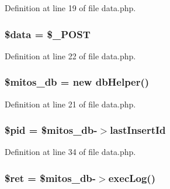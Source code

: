 \-Definition at line 19 of file data.\-php.

\hypertarget{patientfile_2new_2data_8php_a6efc15b5a2314dd4b5aaa556a375c6d6}{
\subsubsection[{\$data}]{\setlength{\rightskip}{0pt plus 5cm}\$data = \$\-\_\-\-P\-O\-S\-T}}\label{patientfile_2new_2data_8php_a6efc15b5a2314dd4b5aaa556a375c6d6}


\-Definition at line 22 of file data.\-php.

\hypertarget{patientfile_2new_2data_8php_ab5d961f93efe4e2e8d8374f01dd6c65a}{
\subsubsection[{\$mitos\-\_\-db}]{\setlength{\rightskip}{0pt plus 5cm}\$mitos\-\_\-db = new {\bf db\-Helper}()}}\label{patientfile_2new_2data_8php_ab5d961f93efe4e2e8d8374f01dd6c65a}


\-Definition at line 21 of file data.\-php.

\hypertarget{patientfile_2new_2data_8php_a9b726f748a2135350f7d86668cc058ee}{
\subsubsection[{\$pid}]{\setlength{\rightskip}{0pt plus 5cm}\$pid = \$mitos\-\_\-db-\/$>$last\-Insert\-Id}}\label{patientfile_2new_2data_8php_a9b726f748a2135350f7d86668cc058ee}


\-Definition at line 34 of file data.\-php.

\hypertarget{patientfile_2new_2data_8php_affd9e3eb0aad0a7ca42912cd925f148c}{
\subsubsection[{\$ret}]{\setlength{\rightskip}{0pt plus 5cm}\$ret = \$mitos\-\_\-db-\/$>$exec\-Log()}}\label{patientfile_2new_2data_8php_affd9e3eb0aad0a7ca42912cd925f148c}


